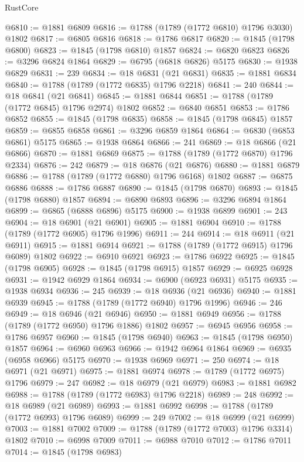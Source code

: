 \begin{lexlean}{RustCore}
\begin{coremodule}
@6810 := @1881 @6809
@6816 := @1788 (@1789 (@1772 @6810) @1796 @3030) @1802
@6817 := @6805 @6816
@6818 := @1786 @6817
@6820 := @1845 (@1798 @6800)
@6823 := @1845 (@1798 @6810) @1857
@6824 := @6820 @6823
@6826 := @3296 @6824 @1864
@6829 := @6795 (@6818 @6826) @5175
@6830 := @1938 @6829
@6831 := 239
@6834 := @18 @6831 (@21 @6831)
@6835 := @1881 @6834
@6840 := @1788 (@1789 (@1772 @6835) @1796 @2218)
@6841 := 240
@6844 := @18 @6841 (@21 @6841)
@6845 := @1881 @6844
@6851 := @1788 (@1789 (@1772 @6845) @1796 @2974) @1802
@6852 := @6840 @6851
@6853 := @1786 @6852
@6855 := @1845 (@1798 @6835)
@6858 := @1845 (@1798 @6845) @1857
@6859 := @6855 @6858
@6861 := @3296 @6859 @1864
@6864 := @6830 (@6853 @6861) @5175
@6865 := @1938 @6864
@6866 := 241
@6869 := @18 @6866 (@21 @6866)
@6870 := @1881 @6869
@6875 := @1788 (@1789 (@1772 @6870) @1796 @2334)
@6876 := 242
@6879 := @18 @6876 (@21 @6876)
@6880 := @1881 @6879
@6886 := @1788 (@1789 (@1772 @6880) @1796 @6168) @1802
@6887 := @6875 @6886
@6888 := @1786 @6887
@6890 := @1845 (@1798 @6870)
@6893 := @1845 (@1798 @6880) @1857
@6894 := @6890 @6893
@6896 := @3296 @6894 @1864
@6899 := @6865 (@6888 @6896) @5175
@6900 := @1938 @6899
@6901 := 243
@6904 := @18 @6901 (@21 @6901)
@6905 := @1881 @6904
@6910 := @1788 (@1789 (@1772 @6905) @1796 @1996)
@6911 := 244
@6914 := @18 @6911 (@21 @6911)
@6915 := @1881 @6914
@6921 := @1788 (@1789 (@1772 @6915) @1796 @6089) @1802
@6922 := @6910 @6921
@6923 := @1786 @6922
@6925 := @1845 (@1798 @6905)
@6928 := @1845 (@1798 @6915) @1857
@6929 := @6925 @6928
@6931 := @1942 @6929 @1864
@6934 := @6900 (@6923 @6931) @5175
@6935 := @1938 @6934
@6936 := 245
@6939 := @18 @6936 (@21 @6936)
@6940 := @1881 @6939
@6945 := @1788 (@1789 (@1772 @6940) @1796 @1996)
@6946 := 246
@6949 := @18 @6946 (@21 @6946)
@6950 := @1881 @6949
@6956 := @1788 (@1789 (@1772 @6950) @1796 @1886) @1802
@6957 := @6945 @6956
@6958 := @1786 @6957
@6960 := @1845 (@1798 @6940)
@6963 := @1845 (@1798 @6950) @1857
@6964 := @6960 @6963
@6966 := @1942 @6964 @1864
@6969 := @6935 (@6958 @6966) @5175
@6970 := @1938 @6969
@6971 := 250
@6974 := @18 @6971 (@21 @6971)
@6975 := @1881 @6974
@6978 := @1789 (@1772 @6975) @1796
@6979 := 247
@6982 := @18 @6979 (@21 @6979)
@6983 := @1881 @6982
@6988 := @1788 (@1789 (@1772 @6983) @1796 @2218)
@6989 := 248
@6992 := @18 @6989 (@21 @6989)
@6993 := @1881 @6992
@6998 := @1788 (@1789 (@1772 @6993) @1796 @6089)
@6999 := 249
@7002 := @18 @6999 (@21 @6999)
@7003 := @1881 @7002
@7009 := @1788 (@1789 (@1772 @7003) @1796 @3314) @1802
@7010 := @6998 @7009
@7011 := @6988 @7010
@7012 := @1786 @7011
@7014 := @1845 (@1798 @6983)

\end{coremodule}
\end{lexlean}
